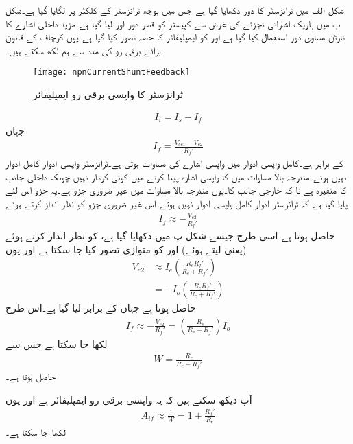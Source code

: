 شکل  الف میں ٹرانزسٹر کا دور دکھایا گیا ہے جس میں بوجھ  ٹرانزسٹر  کے  کلکٹر  پر لگایا گیا ہے۔شکل  ب میں باریک اشاراتی تجزئے کی غرض سے کپیسٹر کو قصر دور اور  لیا گیا ہے۔مزید داخلی اشارے کا نارٹن مساوی دور استعمال کیا گیا ہے اور  کو ایمپلیفائر کا حصہ تصور کیا گیا ہے۔یوں کرچاف کے قانون برائے برقی رو کی مدد سے ہم لکھ سکتے ہیں۔
\begin{figure}
\centering
\texttt{[image: npnCurrentShuntFeedback]}
\caption{ٹرانزسٹر کا واپسی برقی رو ایمپلیفائر}
\label{شکل_واپسی_ٹرانزسٹر_برقی_رو_ایمپلیفائر}
\end{figure}
%
\begin{align*} \label{مساوات_واپسی_ٹرانزسٹر_برقی_رو_ایمپلیفائر_واپسی_مساوات}
I_i=I_s-I_f
\end{align*}
جہاں
\begin{align*}
I_f=\frac{V_{be1}-V_{e2}}{R_f'}
\end{align*}
کے برابر ہے۔کامل واپسی ادوار میں واپسی اشارے کی مساوات  ہوتی ہے۔ٹرانزسٹر واپسی ادوار کامل ادوار نہیں ہوتے۔مندرجہ بالا مساوات میں   کا واپسی اشارہ پیدا کرنے میں کوئی کردار نہیں چونکہ  داخلی جانب کا متغیرہ ہے نا کہ خارجی جانب کا۔یوں مندرجہ بالا مساوات میں  غیر ضروری جزو ہے۔یہ جزو اس لئے پایا گیا ہے کہ ٹرانزسٹر ادوار کامل واپسی ادوار نہیں ہوتے۔اس غیر ضروری جزو کو نظر انداز کرتے ہوئے 
\begin{align*}
I_f \approx -\frac{V_{e2}}{R_f'}
\end{align*}
حاصل ہوتا ہے۔اسی طرح جیسے شکل  پ میں دکھایا گیا ہے،  کو نظر انداز  کرتے ہوئے (یعنی  لیتے ہوئے)  اور  کو متوازی تصور کیا جا سکتا ہے اور یوں
\begin{align*}
V_{e2} &\approx I_e \left (\frac{R_e R_f'}{R_e+R_f'}\right )\\
&=-I_o \left ( \frac{R_e R_f'}{R_e+R_f'}\right )
\end{align*}
حاصل ہوتا ہے جہاں  کے برابر لیا گیا ہے۔اس طرح
\begin{align*}
I_f \approx -\frac{V_{e2}}{R_f'}=\left(\frac{R_e}{R_e+R_f'} \right) I_o
\end{align*}
لکھا جا سکتا ہے  جس سے
\begin{align*}
W =\frac{R_e}{R_e+R_f'}
\end{align*}
حاصل ہوتا ہے۔

آپ دیکھ سکتے ہیں کہ یہ واپسی برقی رو ایمپلیفائر ہے اور یوں
\begin{align}
A_{if} \approx \frac{1}{W}=1+\frac{R_f'}{R_e}
\end{align}
لکھا جا سکتا ہے۔

